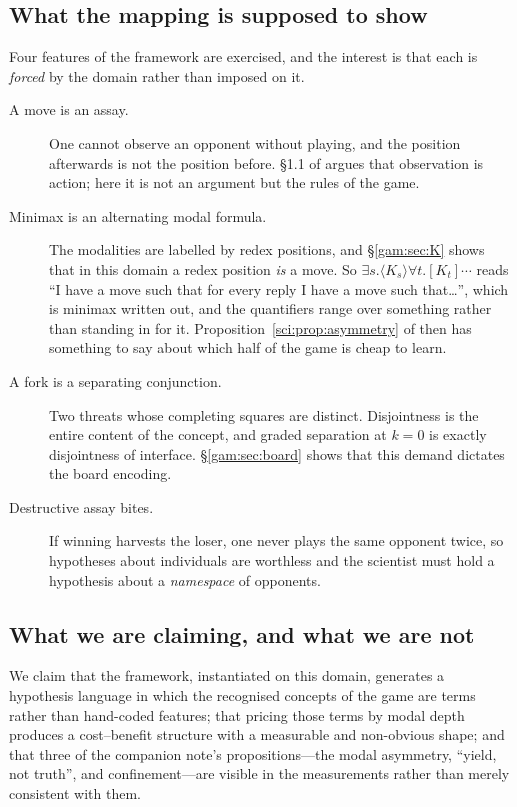 \subsection{What the mapping is supposed to show}\label{gam:S1.2}

Four features of the framework are exercised, and the interest is that each is
\emph{forced} by the domain rather than imposed on it.

\begin{description}
\item[A move is an assay.] One cannot observe an opponent without playing, and
  the position afterwards is not the position before. \S1.1 of \chSci
  argues that observation is action; here it is not an argument but the rules of
  the game.
\item[Minimax is an alternating modal formula.] The modalities are labelled by
  redex positions, and \S\ref{gam:sec:K} shows that in this domain a redex position
  \emph{is} a move. So $\exists s.\langle K_s\rangle \forall t. [K_t]\cdots$
  reads ``I have a move such that for every reply I have a move
  such that\ldots'', which is minimax written out, and the quantifiers range
  over something rather than standing in for it. Proposition~\ref{sci:prop:asymmetry} of
  \chSci then has something to say about which half of the game is
  cheap to learn.
\item[A fork is a separating conjunction.] Two threats whose completing squares
  are distinct. Disjointness is the entire content of the concept, and graded
  separation at $k=0$ is exactly disjointness of interface. \S\ref{gam:sec:board}
  shows that this demand dictates the board encoding.
\item[Destructive assay bites.] If winning harvests the loser, one never plays
  the same opponent twice, so hypotheses about individuals are worthless and the
  scientist must hold a hypothesis about a \emph{namespace} of opponents.
\end{description}

\subsection{What we are claiming, and what we are not}\label{gam:S1.3}

We claim that the framework, instantiated on this domain, generates a hypothesis
language in which the recognised concepts of the game are terms rather than
hand-coded features; that pricing those terms by modal depth produces a
cost--benefit structure with a measurable and non-obvious shape; and that three
of the companion note's propositions---the modal asymmetry, ``yield, not
truth'', and confinement---are visible in the measurements rather than merely
consistent with them.

